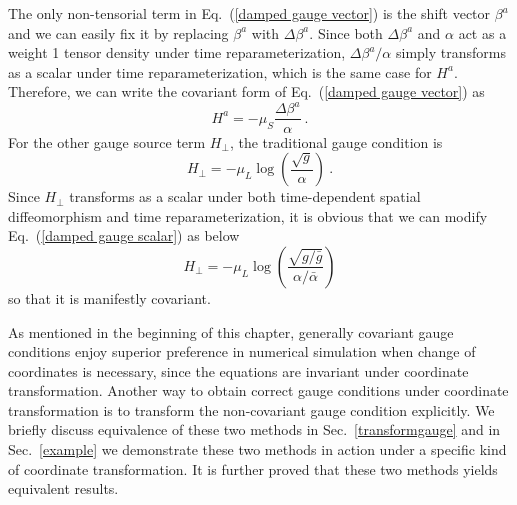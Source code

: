 The only non-tensorial term in Eq.~(\ref{damped gauge vector}) is the shift vector $\beta^{a}$ and we can easily fix it by replacing $\beta^{a}$ with $\Delta \beta^{a}$. Since both $\Delta \beta^{a}$ and $\alpha$ act as a weight 1 tensor density under time reparameterization, $\Delta \beta^{a}/\alpha$ simply transforms as a scalar under time reparameterization, which is the same case for $H^{a}$. Therefore, we can write the covariant form of Eq.~(\ref{damped gauge vector}) as
\begin{equation}\label{covariant damped gauge vector}
H^{a} = -\mu_{S}\frac{\Delta \beta^{a}}{\alpha} \ .
\end{equation}
For the other gauge source term $H_{\perp}$, the traditional gauge condition is
\begin{equation}\label{damped gauge scalar}
H_{\perp} = -\mu_{L}\log\left(\frac{\sqrt{g}}{\alpha}\right) \ .
\end{equation}
Since $H_{\perp}$ transforms as a scalar under both time-dependent spatial diffeomorphism and time reparameterization, it is obvious that we can modify Eq.~(\ref{damped gauge scalar}) as below
\begin{equation}\label{covariant damped gauge scalar}
H_{\perp} = -\mu_{L}\log\left(\frac{\sqrt{g/{\bar g}}}{\alpha/{\bar \alpha}}\right)
\end{equation} 
so that it is manifestly covariant. 

As mentioned in the beginning of this chapter, generally covariant gauge conditions enjoy superior preference in numerical simulation when change of coordinates is necessary, since the equations are invariant under coordinate transformation. Another way to obtain correct gauge conditions under coordinate transformation is to transform the non-covariant gauge condition explicitly. We briefly discuss equivalence of these two methods in Sec.~\ref{transformgauge} and in Sec.~\ref{example} we demonstrate these two methods in action under a specific kind of coordinate transformation. It is further proved that these two methods yields equivalent results. 
